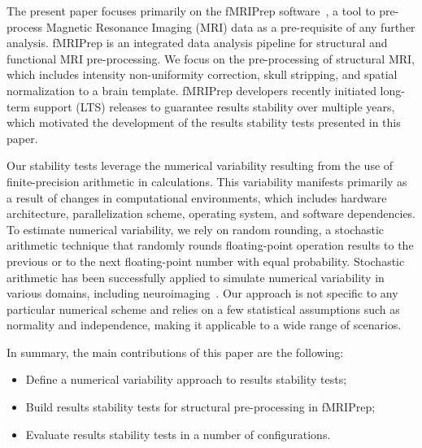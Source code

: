 \documentclass[lettersize,journal]{IEEEtran}
\newcommand{\fmriprep}{fMRIPrep\xspace}
\begin{document}
The present paper focuses primarily on the \fmriprep software~\cite{esteban2019fmriprep}, a tool to pre-process Magnetic Resonance Imaging (MRI) data as a pre-requisite of any further analysis. \fmriprep is an integrated data analysis pipeline for structural and functional MRI pre-processing. We focus on the pre-processing of structural MRI, which includes intensity non-uniformity correction, skull stripping, and spatial normalization to a brain template. 
 \fmriprep developers recently initiated long-term support (LTS) releases to guarantee results stability over multiple years, which motivated the development of the results stability tests presented in this paper. 


Our stability tests leverage the numerical variability resulting from the use of finite-precision arithmetic in calculations. This variability manifests primarily as a result of changes in  computational environments, which includes hardware architecture, parallelization scheme, operating system, and software dependencies. To estimate numerical variability, we rely on random rounding, a stochastic arithmetic technique that randomly rounds floating-point operation results to the previous or to the next floating-point number with equal probability. Stochastic arithmetic has been successfully applied to simulate numerical variability in various domains, including neuroimaging~\cite{salari2021accurate, kiar2021numerical}. Our approach is not specific to any particular numerical scheme and relies on a few statistical assumptions such as normality and independence, making it applicable to a wide range of scenarios.

In summary, the main contributions of this paper are the following:
\begin{itemize}
    \item Define a numerical variability approach to results stability tests;
    \item Build results stability tests for structural pre-processing in \fmriprep;
    \item Evaluate results stability tests in a number of configurations.
\end{itemize}
\end{document}
